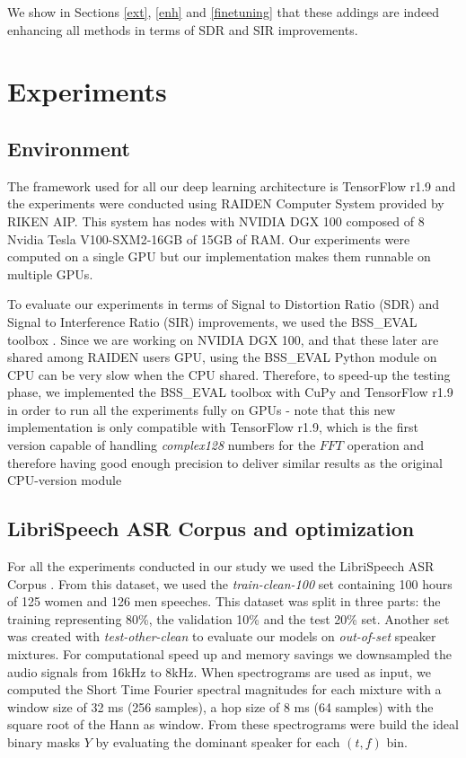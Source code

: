 \documentclass[master, tikz, final,11pt, dvipdfmx]{iscs-thesis}
\begin{document}
We show in Sections \ref{ext}, \ref{enh} and \ref{finetuning} that these addings are indeed enhancing all methods in terms of SDR and SIR improvements.


\chapter{Experiments}

\section{Environment}

The framework used for all our deep learning architecture is TensorFlow r1.9 \cite{TF} and the experiments were conducted using RAIDEN Computer System provided by RIKEN AIP. This system has nodes with NVIDIA DGX 100 composed of 8 Nvidia Tesla V100-SXM2-16GB of 15GB of RAM. Our experiments were computed on a single GPU but our implementation makes them runnable on multiple GPUs. 

To evaluate our experiments in terms of Signal to Distortion Ratio (SDR) and Signal to Interference Ratio (SIR) improvements, we used the BSS\_EVAL toolbox \cite{BSS}. Since we are working on NVIDIA DGX 100, and that these later are shared among RAIDEN users GPU, using the BSS\_EVAL Python module on CPU can be  very slow when the CPU shared. Therefore, to speed-up the testing phase, we implemented the BSS\_EVAL toolbox with CuPy \cite{cupy} and TensorFlow r1.9 in order to run all the experiments fully on GPUs - note that this new implementation is only compatible with TensorFlow r1.9, which is the first version capable of handling \textit{complex128} numbers for the $FFT$ operation and therefore having good enough precision to deliver similar results as the original CPU-version module

\section{LibriSpeech ASR Corpus and optimization}

For all the experiments conducted in our study we used the LibriSpeech ASR Corpus \cite{LIBRI}. From this dataset, we used the \textit{train-clean-100} set containing 100 hours of 125 women and 126 men speeches. This dataset was split in three parts: the training representing 80\%, the validation 10\% and the test 20\% set. Another set was created with \textit{test-other-clean} to evaluate our models on \textit{out-of-set} speaker mixtures. For computational speed up and memory savings we downsampled the audio signals from 16kHz to 8kHz.
When spectrograms are used as input, we computed the Short Time Fourier spectral magnitudes for each mixture with a window size of 32 ms (256 samples), a hop size of 8 ms (64 samples) with the square root of the Hann as window. From these spectrograms were build the ideal binary masks $Y$ by evaluating the dominant speaker for each $(t,f)$ bin.
\end{document}
